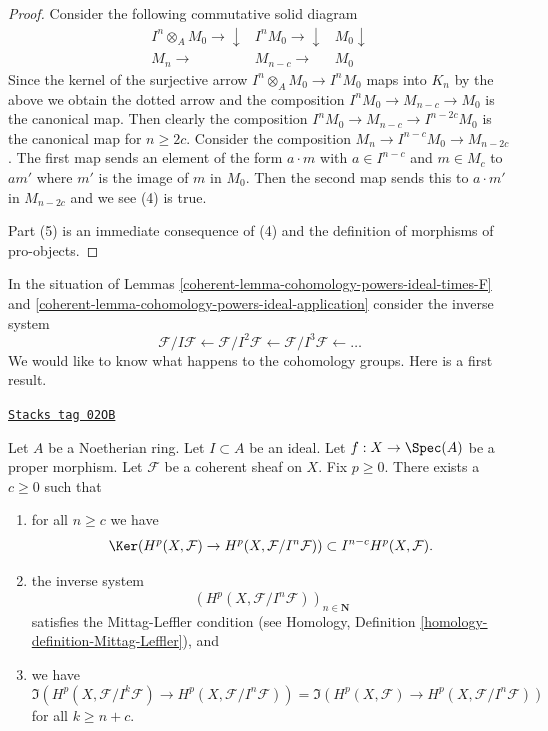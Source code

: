 \begin{proof}
\medskip\noindent
Consider the following commutative solid diagram
$$
\begin{array}{ccc}I^n \otimes_A M_0 \longrightarrow\downarrow & I^nM_0 \longrightarrow\downarrow & M_0 \downarrow \\ M_n \longrightarrow & M_{n - c} \longrightarrow & M_0\end{array}
$$
Since the kernel of the surjective arrow $I^n \otimes_A M_0 \to I^nM_0$
maps into $K_n$ by the above we obtain the dotted arrow and the
composition $I^nM_0 \to M_{n - c} \to M_0$ is the canonical map.
Then clearly the composition $I^nM_0 \to M_{n - c} \to I^{n - 2c}M_0$
is the canonical map for $n \geq 2c$. Consider the composition
$M_n \to I^{n - c}M_0 \to M_{n - 2c}$. The first map
sends an element of the form $a \cdot m$
with $a \in I^{n - c}$ and $m \in M_c$
to $a m'$ where $m'$ is the image of $m$ in $M_0$.
Then the second map sends this to $a \cdot m'$ in $M_{n - 2c}$ and
we see (4) is true.

\medskip\noindent
Part (5) is an immediate consequence of (4) and the definition of
morphisms of pro-objects.
\end{proof}

In the situation of Lemmas \ref{coherent-lemma-cohomology-powers-ideal-times-F} and
\ref{coherent-lemma-cohomology-powers-ideal-application} consider the inverse
system
$$
\mathcal{F}/I\mathcal{F} \leftarrow
\mathcal{F}/I^2\mathcal{F} \leftarrow
\mathcal{F}/I^3\mathcal{F} \leftarrow \ldots
$$
We would like to know what happens to the cohomology groups.
Here is a first result.

\begin{lemma}
\label{coherent-lemma-ML-cohomology-powers-ideal}
\href{https://stacks.math.columbia.edu/tag/02OB}{\texttt{Stacks tag 02OB}}

Let $A$ be a Noetherian ring.
Let $I \subset A$ be an ideal.
Let $f : X \to \Spec(A)$ be a proper morphism.
Let $\mathcal{F}$ be a coherent sheaf on $X$.
Fix $p \geq 0$. There exists a $c \geq 0$ such that
\begin{enumerate}
\item for all $n \geq c$ we have
$$
\Ker(H^p(X, \mathcal{F}) \to H^p(X, \mathcal{F}/I^n\mathcal{F})) \subset
I^{n - c}H^p(X, \mathcal{F}).
$$
\item the inverse system
$$
\left(H^p(X, \mathcal{F}/I^n\mathcal{F})\right)_{n \in \mathbf{N}}
$$
satisfies the Mittag-Leffler condition (see
Homology, Definition \ref{homology-definition-Mittag-Leffler}), and
\item we have
$$
\Im(H^p(X, \mathcal{F}/I^k\mathcal{F})
\to H^p(X, \mathcal{F}/I^n\mathcal{F}))
=
\Im(H^p(X, \mathcal{F})
\to H^p(X, \mathcal{F}/I^n\mathcal{F}))
$$
for all $k \geq n + c$.
\end{enumerate}
\end{lemma}

